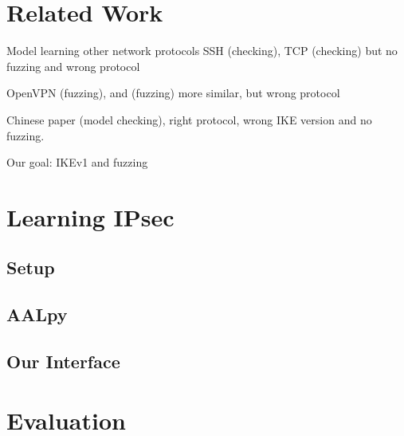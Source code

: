 \documentclass[runningheads]{llncs}
\begin{document}
\section{Related Work} \label{chap:3} %
Model learning other network protocols SSH \cite{fiteruau2017model} (checking), TCP \cite{fiteruau2016combining} (checking) but no fuzzing and wrong protocol

OpenVPN \cite{novickis2016protocol} (fuzzing), and \cite{daniel2018inferring} (fuzzing) more similar, but wrong protocol

Chinese paper \cite{guo2019model} (model checking), right protocol, wrong IKE version and no fuzzing.

Our goal: IKEv1 and fuzzing




\section{Learning IPsec} \label{chap:4} %
\subsection{Setup} %
\subsection{AALpy} %
\subsection{Our Interface} %

\section{Evaluation} \label{chap:5} %
\end{document}
